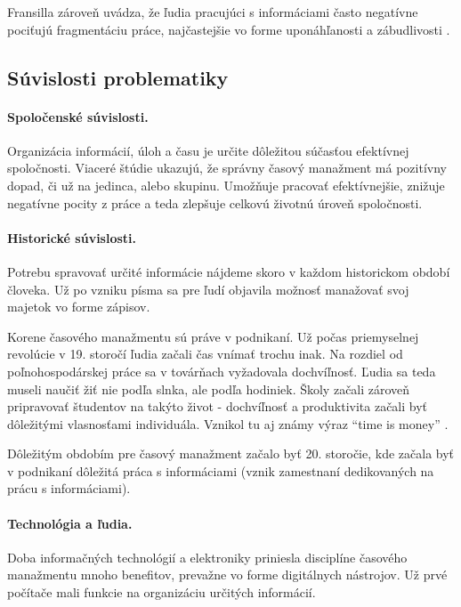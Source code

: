 \documentclass[10pt,slovak,a4paper]{article}
\begin{document}
		Fransilla zároveň uvádza, že ľudia pracujúci s informáciami často negatívne pociťujú fragmentáciu práce, najčastejšie vo forme uponáhľanosti a zábudlivosti \cite{Franssila}.
		
	\subsection{Súvislosti problematiky} \label{spojitost}
		
		\paragraph{Spoločenské súvislosti.\\}
		Organizácia informácií, úloh a času je určite dôležitou súčasťou efektívnej spoločnosti. Viaceré štúdie \cite{Macan} ukazujú, že správny časový manažment má pozitívny dopad, či už na jedinca, alebo skupinu. Umožňuje pracovať efektívnejšie, znižuje negatívne pocity z práce a teda zlepšuje celkovú životnú úroveň spoločnosti.
		
		\paragraph{Historické súvislosti.\\}
		Potrebu spravovať určité informácie nájdeme skoro v každom historickom období človeka. Už po vzniku písma sa pre ľudí objavila možnosť manažovať svoj majetok vo forme zápisov.
		
		Korene časového manažmentu sú práve v podnikaní. Už počas priemyselnej revolúcie v 19. storočí ľudia začali čas vnímať trochu inak. Na rozdiel od poľnohospodárskej práce sa v továrňach vyžadovala dochvíľnosť. Ľudia sa teda museli naučiť žiť nie podľa slnka, ale podľa hodiniek. Školy začali zároveň pripravovať študentov na takýto život - dochvíľnosť a produktivita začali byť dôležitými vlasnosťami individuála. Vznikol tu aj známy výraz \enquote{time is money} \cite{TimeMagHisto}.
		
		Dôležitým obdobím pre časový manažment začalo byť 20. storočie, kde začala byť v podnikaní dôležitá práca s informáciami (vznik zamestnaní dedikovaných na prácu s informáciami).
		
		\paragraph{Technológia a ľudia.\\}
		Doba informačných technológií a elektroniky priniesla disciplíne časového manažmentu mnoho benefitov, prevažne vo forme digitálnych nástrojov. Už prvé počítače mali funkcie na organizáciu určitých informácií. 
		
\end{document}
